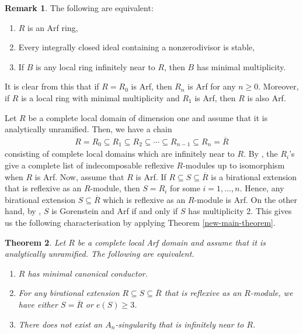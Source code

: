 \documentclass[12pt]{amsart}
\newtheorem{theorem}{Theorem}[section]
\theoremstyle{definition}
\newtheorem{remark}[theorem]{Remark}
\begin{document}
\begin{remark}
    The following are equivalent:
\begin{enumerate}
    \item $R$ is an Arf ring,
    \item Every integrally closed ideal containing a nonzerodivisor is stable,
    \item If $B$ is any local ring infinitely near to $R$, then $B$ has minimal multiplicity.
\end{enumerate}
It is clear from this that if $R = R_0$ is Arf, then $R_n$ is Arf for any $n \geq 0$. Moreover, if $R$ is a local ring with minimal multiplicity and $R_1$ is Arf, then $R$ is also Arf.
\end{remark}
Let $R$ be a complete local domain of dimension one and assume that it is analytically unramified. Then, we have a chain 
\begin{align*}
R = R_0 \subseteq R_1 \subseteq R_2 \subseteq \cdots \subseteq R_{n-1} \subseteq R_n = \overline{R}
\end{align*}
consisting of complete local domains which are infinitely near to $R$. By \cite[Theorem A]{Dao}, the $R_i$'s give a complete list of indecomposable reflexive $R$-modules up to isomorphism when $R$ is Arf. Now, assume that $R$ is Arf. If $R \subseteq S \subseteq \overline{R}$ is a birational extension that is reflexive as an $R$-module, then $S = R_i$ for some $i = 1, \ldots, n$. Hence, any birational extension $S \subseteq \overline{R}$ which is reflexive as an $R$-module is Arf. On the other hand, by \cite[Corollary 4.3]{Barucci-Froberg-value-semigroups}, $S$ is Gorenstein and Arf if and only if $S$ has multiplicity 2. This gives us the following characterisation by applying Theorem \ref{new-main-theorem}.
\begin{theorem}
    Let $R$ be a complete local Arf domain and assume that it is analytically unramified. The following are equivalent.
    \begin{enumerate}
        \item $R$ has minimal canonical conductor.
        \item For any birational extension $R\subseteq S \subseteq \overline{R}$ that is reflexive as an $R$-module, we have either $S = \overline{R}$ or $e(S) \geq 3$.
        \item There does not exist an $A_n$-singularity that is infinitely near to $R$.
    \end{enumerate}
\end{theorem}
\end{document}
